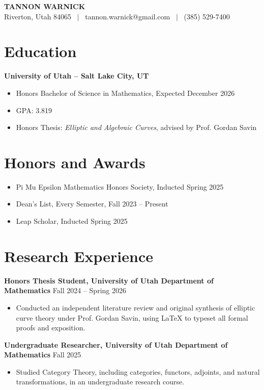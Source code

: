 \documentclass[10.5pt]{article}
\newcommand{\jobheader}[2]{%
  \noindent\textbf{#1} \hfill #2\par
}
\begin{document}
\begin{center}
  {\fontsize{22}{24}\selectfont\bfseries TANNON WARNICK}\\[3pt]
  {\small Riverton, Utah 84065 ~$\vert$~ tannon.warnick@gmail.com ~$\vert$~ (385) 529-7400}
\end{center}
\vspace{4pt}

\section*{Education}
\jobheader{University of Utah -- Salt Lake City, UT}{}
\begin{itemize}
  \item Honors Bachelor of Science in Mathematics, Expected December 2026
  \item GPA: 3.819
  \item Honors Thesis: \textit{Elliptic and Algebraic Curves}, advised by Prof. Gordan Savin
\end{itemize}

\section*{Honors and Awards}
\begin{itemize}
  \item Pi Mu Epsilon Mathematics Honors Society, Inducted Spring 2025
  \item Dean's List, Every Semester, Fall 2023 -- Present
  \item Leap Scholar, Inducted Spring 2025
\end{itemize}

\section*{Research Experience}
\jobheader{Honors Thesis Student, University of Utah Department of Mathematics}{Fall 2024 -- Spring 2026}
\begin{itemize}
  \item Conducted an independent literature review and original synthesis of elliptic curve theory under Prof. Gordan Savin, using LaTeX to typeset all formal proofs and exposition.
\end{itemize}
\jobheader{Undergraduate Researcher, University of Utah Department of Mathematics}{Fall 2025}
\begin{itemize}
  \item Studied Category Theory, including categories, functors, adjoints, and natural transformations, in an undergraduate research course.
\end{itemize}
\end{document}

